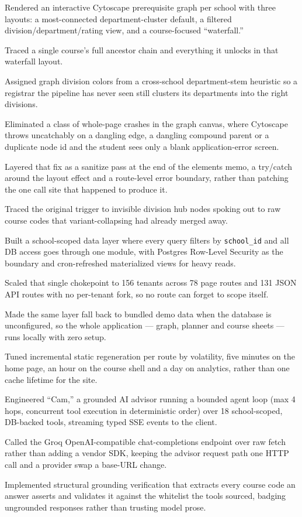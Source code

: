 \documentclass[letterpaper,11pt]{article}
\newcommand{\resumeItem}[1]{
  \item\small{
    {#1 \vspace{-2pt}}
  }
}
\begin{document}
            \resumeItem{Rendered an interactive Cytoscape prerequisite graph per school with three layouts: a most-connected department-cluster default, a filtered division/department/rating view, and a course-focused ``waterfall.''}
            \resumeItem{Traced a single course's full ancestor chain and everything it unlocks in that waterfall layout.}
            \resumeItem{Assigned graph division colors from a cross-school department-stem heuristic so a registrar the pipeline has never seen still clusters its departments into the right divisions.}
            \resumeItem{Eliminated a class of whole-page crashes in the graph canvas, where Cytoscape throws uncatchably on a dangling edge, a dangling compound parent or a duplicate node id and the student sees only a blank application-error screen.}
            \resumeItem{Layered that fix as a sanitize pass at the end of the elements memo, a try/catch around the layout effect and a route-level error boundary, rather than patching the one call site that happened to produce it.}
            \resumeItem{Traced the original trigger to invisible division hub nodes spoking out to raw course codes that variant-collapsing had already merged away.}
            \resumeItem{Built a school-scoped data layer where every query filters by \texttt{school\_id} and all DB access goes through one module, with Postgres Row-Level Security as the boundary and cron-refreshed materialized views for heavy reads.}
            \resumeItem{Scaled that single chokepoint to 156 tenants across 78 page routes and 131 JSON API routes with no per-tenant fork, so no route can forget to scope itself.}
            \resumeItem{Made the same layer fall back to bundled demo data when the database is unconfigured, so the whole application --- graph, planner and course sheets --- runs locally with zero setup.}
            \resumeItem{Tuned incremental static regeneration per route by volatility, five minutes on the home page, an hour on the course shell and a day on analytics, rather than one cache lifetime for the site.}
            \resumeItem{Engineered ``Cam,'' a grounded AI advisor running a bounded agent loop (max 4 hops, concurrent tool execution in deterministic order) over 18 school-scoped, DB-backed tools, streaming typed SSE events to the client.}
            \resumeItem{Called the Groq OpenAI-compatible chat-completions endpoint over raw fetch rather than adding a vendor SDK, keeping the advisor request path one HTTP call and a provider swap a base-URL change.}
            \resumeItem{Implemented structural grounding verification that extracts every course code an answer asserts and validates it against the whitelist the tools sourced, badging ungrounded responses rather than trusting model prose.}
\end{document}
